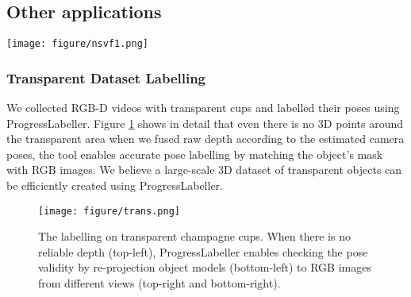 \subsection{Other applications}


\begin{figure*}
    \centering
    \texttt{[image: figure/nsvf1.png]}
    \caption{Comparison of best (left) and worst (right) validation pose renderings from the NSVF model. The smaller images with black background on top corners are the ground truth masks, and those on bottom corners are rendered output from NSVF, and the middle larger images are the renderings imposed onto the original captured image in greyscale. The best image (left) had an average pixelwise L2 error of $0.0067$, and the worst (right) had an average pixelwise L2 error of $0.1867$.}
    \label{fig:nsvf_fig}
\end{figure*}

\label{sec:other}
\subsubsection{Transparent Dataset Labelling}
We collected RGB-D videos with transparent cups and labelled their poses using ProgressLabeller. Figure \ref{fig:demo_trans} shows in detail that even there is no 3D points around the transparent area when we fused raw depth according to the estimated camera poses, the tool enables accurate pose labelling by matching the object's mask with RGB images. We believe a large-scale 3D dataset of transparent objects can be efficiently created using ProgressLabeller.

\begin{figure}[htbp]
    \centering
    \texttt{[image: figure/trans.png]}
    \caption{The labelling on transparent champagne cups. When there is no reliable depth (top-left), ProgressLabeller enables checking the pose validity by re-projection object models (bottom-left) to RGB images from different views (top-right and bottom-right).}
    \label{fig:demo_trans}
\end{figure}


